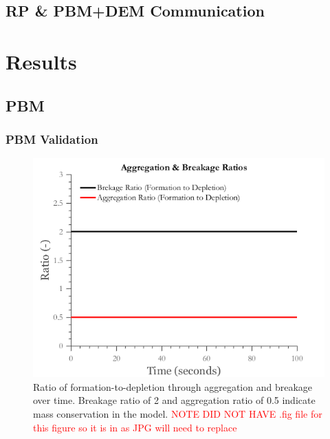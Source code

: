 \documentclass[preprint,11pt,authoryear]{elsarticle}
\begin{document}
	  
	  \subsection{RP \& PBM+DEM Communication}
	
	
	  
	\section{Results}
	  \subsection{PBM}
	    \subsubsection{PBM Validation}
	      
	
	      \begin{figure}[H]
	      \centering
	      \includegraphics[scale=0.5]{rslts_anik_pbm_ratios}
	      \caption{Ratio of formation-to-depletion through aggregation and breakage over time. Breakage ratio of 2 and aggregation ratio of 0.5 indicate mass conservation in the model. \textcolor{red}{NOTE DID NOT HAVE .fig file for this figure so it is in as JPG will need to replace} }
	      \label{fig:rslts_anik_pbm_ratios}
	      \end{figure}
	     
\end{document}
